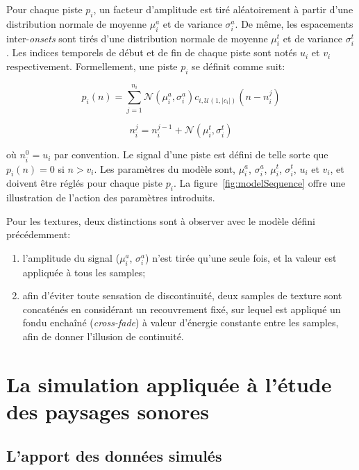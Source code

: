  Pour chaque piste $p_i$, un facteur d'amplitude est tiré aléatoirement à partir d'une distribution normale de moyenne $\mu^a_i$ et de variance $\sigma^a_i$. De même, les espacements inter-\emph{onsets} sont tirés d'une distribution normale de moyenne $\mu^t_i$ et de variance $\sigma^t_i$. Les indices temporels de début et de fin de chaque piste sont notés $u_i$ et $v_i$ respectivement. Formellement, une piste $p_i$ se définit comme suit:
 
\begin{equation}
\label{eq:ch4_eq1}
p_{i}(n)= \sum_{j=1}^{n_i} \mathcal{N}(\mu^a_{i},\sigma^a_{i})c_{i, \mathcal{U} (1, |c_i|)}(n-n^j_i)
\end{equation}

\begin{equation}
\label{eq:ch4_eq2}
n_i^j=n_i^{j-1} + \mathcal{N}({\mu^t_{i},\sigma^t_{i}})
\end{equation}

où $n_i^0=u_i$ par convention. Le signal d'une piste est défini de telle sorte que $p_i(n)=0$ si $n>v_i$. Les paramètres du modèle sont, $\mu^a_i$,  $\sigma^a_i$,   $\mu^t_i$,  $\sigma^t_i$, $u_i$ et $v_i$, et doivent être réglés pour chaque piste $p_i$. La figure~\ref{fig:modelSequence} offre une illustration de l'action des paramètres introduits.

Pour les textures, deux distinctions sont à observer avec le modèle défini précédemment: 

\begin{enumerate}
\item l'amplitude du signal ($\mu^a_i$,  $\sigma^a_i$) n'est tirée qu'une seule fois, et la valeur est appliquée à tous les samples;
\item afin d'éviter toute sensation de discontinuité, deux samples de texture sont concaténés en considérant un recouvrement fixé, sur lequel est appliqué un fondu enchaîné (\emph{cross-fade}) à valeur d'énergie constante entre les samples, afin de donner l'illusion de continuité.
\end{enumerate}

\section{La simulation appliquée à l'étude des paysages sonores}
\label{sec:ch4_modAnaSo}

\subsection{L'apport des données simulés}

